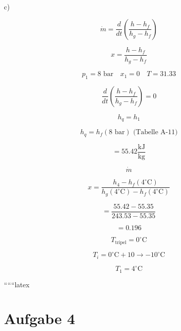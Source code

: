 c)

\[
\dot{m} = \frac{d}{dt} \left( \frac{h - h_f}{h_g - h_f} \right)
\]

\[
x = \frac{h - h_f}{h_g - h_f}
\]

\[
p_1 = 8 \text{ bar} \quad x_1 = 0 \quad T = 31.33
\]


\[
\frac{d}{dt} \left( \frac{h - h_f}{h_g - h_f} \right) = 0
\]

\[
h_{q} = h_{1}
\]

\[
h_{q} = h_{f}(8 \text{ bar}) \text{ (Tabelle A-11)}
\]

\[
= 55.42 \frac{\text{kJ}}{\text{kg}}
\]

\[
\dot{m}
\]

\[
x = \frac{h_{4} - h_{f}(4^\circ \text{C})}{h_{g}(4^\circ \text{C}) - h_{f}(4^\circ \text{C})}
\]

\[
= \frac{55.42 - 55.35}{243.53 - 55.35}
\]

\[
= 0.196
\]

\[
T_{\text{tripel}} = 0^\circ \text{C}
\]

\[
T_i = 0^\circ \text{C} + 10 \rightarrow -10^\circ \text{C}
\]

\[
T_1 = 4^\circ \text{C}
\]


``````latex


\section*{Aufgabe 4}